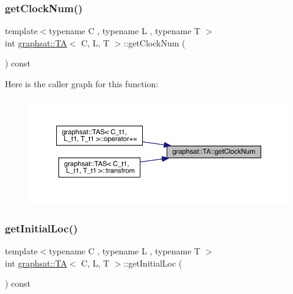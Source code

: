 \subsubsection{\texorpdfstring{getClockNum()}{getClockNum()}}
{\footnotesize\ttfamily template$<$typename C , typename L , typename T $>$ \\
int \mbox{\hyperlink{classgraphsat_1_1_t_a}{graphsat\+::\+TA}}$<$ C, L, T $>$\+::get\+Clock\+Num (\begin{DoxyParamCaption}{ }\end{DoxyParamCaption}) const\hspace{0.3cm}{\ttfamily [inline]}}

Here is the caller graph for this function\+:
\nopagebreak
\begin{figure}[H]
\begin{center}
\leavevmode
\includegraphics[width=350pt]{classgraphsat_1_1_t_a_a5c6fed7d2a3e06cb221049fb42eb1800_icgraph}
\end{center}
\end{figure}
\mbox{\label{classgraphsat_1_1_t_a_a26f74ce62e8b0e5a73fed0302c73781d}} 
\subsubsection{\texorpdfstring{getInitialLoc()}{getInitialLoc()}}
{\footnotesize\ttfamily template$<$typename C , typename L , typename T $>$ \\
int \mbox{\hyperlink{classgraphsat_1_1_t_a}{graphsat\+::\+TA}}$<$ C, L, T $>$\+::get\+Initial\+Loc (\begin{DoxyParamCaption}{ }\end{DoxyParamCaption}) const\hspace{0.3cm}{\ttfamily [inline]}}

